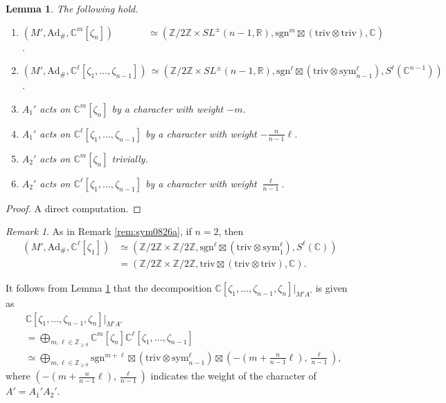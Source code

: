 \documentclass[reqno,11pt]{amsart}
\newtheorem{lem}[equation]{Lemma}
\theoremstyle{remark}
\newtheorem{rem}[equation]{Remark}
\theoremstyle{definition}
\numberwithin{equation}{section}
\newcommand{\R}{\mathbb{R}}
\newcommand{\C}{\mathbb{C}}
\newcommand{\Z}{\mathbb{Z}}
\newcommand{\Ad}{\mathrm{Ad}}
\newcommand{\triv}{\mathrm{triv}}
\newcommand{\sym}{\mathrm{sym}}
\newcommand{\sgn}{\mathrm{sgn}}
\begin{document}
\begin{lem}\label{lem:GL-MA}
The following hold.

\begin{enumerate}

\item[\emph{(1)}]
$(M', \Ad_\#, \C^m[\zeta_n]) 
\hspace{42pt}
\simeq (\Z/2\Z\times SL^\pm(n-1,\R), \sgn^m \boxtimes (\triv \otimes \triv), \C)$.

\item[\emph{(2)}]
$(M', \Ad_\#, \C^\ell[\zeta_1,\ldots, \zeta_{n-1}]) 
\hspace{2pt}
\simeq (\Z/2\Z\times SL^\pm(n-1,\R), \sgn^\ell \boxtimes 
(\triv \otimes \sym^\ell_{n-1}), S^\ell(\C^{n-1}))$.

\item[\emph{(3)}]
$A_1'$ acts on $\C^m[\zeta_n]$ by a character with weight $-m$.

\item[\emph{(4)}]
$A_1'$ acts on $\C^\ell[\zeta_1,\ldots, \zeta_{n-1}]$ by a character 
with weight $-\frac{n}{n-1}\ell$.

\item[\emph{(4)}]
$A_2'$ acts on $\C^m[\zeta_n]$ trivially.

\item[\emph{(5)}]
$A_2'$ acts on $\C^\ell[\zeta_1,\ldots, \zeta_{n-1}]$ by a character with weight
$\tfrac{\ell}{n-1}$.


\end{enumerate}

\end{lem}

\begin{proof}
A direct computation.
\end{proof}

\begin{rem}
As in Remark \ref{rem:sym0826a}, if $n=2$, then 
\begin{align*}
(M', \Ad_\#, \C^\ell[\zeta_1]) 
&\simeq (\Z/2\Z\times \Z/2\Z, \sgn^\ell \boxtimes 
(\triv \otimes \sym^\ell_1), S^\ell(\C))\\
&= (\Z/2\Z\times \Z/2\Z, \triv \boxtimes 
(\triv \otimes \triv), \C).
\end{align*}
\end{rem}

It follows from Lemma \ref{lem:GL-MA} that the decomposition
$\C[\zeta_1, \ldots, \zeta_{n-1},\zeta_n]\vert_{M'A'}$ is given  as
\begin{align}\label{eqn:MA2}
&\C[\zeta_1, \ldots, \zeta_{n-1},\zeta_n]\vert_{M'A'}\\
&=
\bigoplus_{m, \ell \in \Z_{\geq 0}} 
\C^m[\zeta_n]  
\C^\ell[\zeta_1,\ldots,\zeta_{n-1}]\nonumber\\
&\simeq
\bigoplus_{m, \ell \in \Z_{\geq 0}} 
\sgn^{m+\ell}\boxtimes(\triv\otimes\sym^\ell_{n-1}) \boxtimes 
(-(m+\tfrac{n}{n-1}\ell), \tfrac{\ell}{n-1}),
\end{align}
where  $(-(m+\tfrac{n}{n-1}\ell),\tfrac{\ell}{n-1})$ 
indicates the weight of the character of $A'=A_1'A_2'$.
\end{document}
